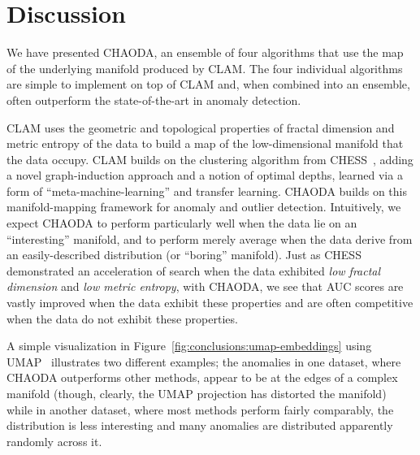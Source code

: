 \section{Discussion}
\label{sec:discussion}

We have presented CHAODA, an ensemble of four algorithms that use the map of the underlying manifold produced by CLAM\@.
The four individual algorithms are simple to implement on top of CLAM and, when combined into an ensemble, often outperform the state-of-the-art in anomaly detection.

CLAM uses the geometric and topological properties of fractal dimension and metric entropy of the data to build a map of the low-dimensional manifold that the data occupy.
CLAM builds on the clustering algorithm from CHESS~\cite{ishaq2019clustered}, adding a novel graph-induction approach and a notion of optimal depths, learned via a form of ``meta-machine-learning'' and transfer learning.
CHAODA builds on this manifold-mapping framework for anomaly and outlier detection.
Intuitively, we expect CHAODA to perform particularly well when the data lie on an ``interesting'' manifold, and to perform merely average when the data derive from an easily-described distribution (or ``boring'' manifold).
Just as CHESS demonstrated an acceleration of search when the data exhibited \emph{low fractal dimension} and \emph{low metric entropy}, with CHAODA, we see that AUC scores are vastly improved when the data exhibit these properties and are often competitive when the data do not exhibit these properties.

A simple visualization in Figure~\ref{fig:conclusions:umap-embeddings} using UMAP~\cite{mcinnes2018umap} illustrates two different examples; the anomalies in one dataset, where CHAODA outperforms other methods, appear to be at the edges of a complex manifold (though, clearly, the UMAP projection has distorted the manifold) while in another dataset, where most methods perform fairly comparably, the distribution is less interesting and many anomalies are distributed apparently randomly across it.



